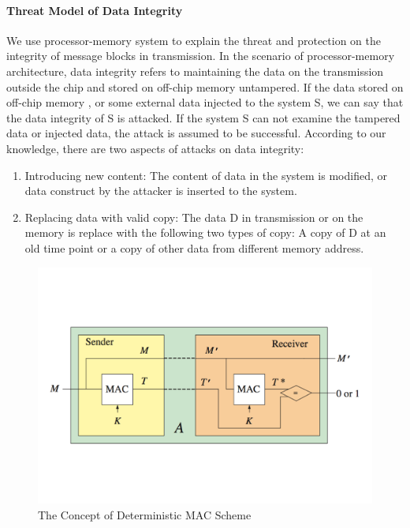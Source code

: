 \documentclass{article}
\begin{document}
\paragraph{Threat Model of Data Integrity}
We use processor-memory system to explain the threat and protection on the integrity of message blocks in transmission. 
In the scenario of processor-memory architecture, data integrity refers to maintaining the data on the transmission outside the chip and stored on off-chip memory untampered. If the data stored on off-chip memory , or some external data injected to the system S, we can say that the data integrity of S is attacked. If the system S can not examine the tampered data or injected data, the attack is assumed to be successful. According to our knowledge, there are two aspects of attacks on data integrity:
\begin{enumerate}
	\item Introducing new content: The content of data in the system is modified, or data construct by the attacker is inserted to the system.
	\item Replacing data with valid copy: The data D in transmission or on the memory is replace with the following two types of copy: A copy of D at an old time point or a copy of other data from different memory address.
\end{enumerate}
\begin{figure}[htbp]
\centering
\includegraphics[scale=0.4]{./diagrams/MAC.pdf}
\caption{The Concept of Deterministic MAC Scheme}
\label{deterministic_mac }
\end{figure}
\end{document}
